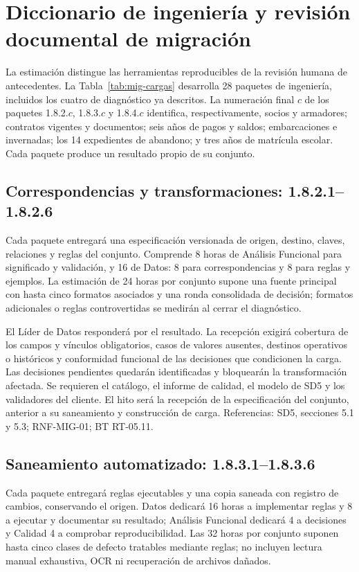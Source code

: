 \section{Diccionario de ingeniería y revisión documental de migración}
La estimación distingue las herramientas reproducibles de la revisión humana de antecedentes. La Tabla~\ref{tab:mig-cargas} desarrolla 28 paquetes de ingeniería, incluidos los cuatro de diagnóstico ya descritos. La numeración final $c$ de los paquetes 1.8.2.$c$, 1.8.3.$c$ y 1.8.4.$c$ identifica, respectivamente, socios y armadores; contratos vigentes y documentos; seis años de pagos y saldos; embarcaciones e invernadas; los 14 expedientes de abandono; y tres años de matrícula escolar. Cada paquete produce un resultado propio de su conjunto.



\subsection{Correspondencias y transformaciones: 1.8.2.1--1.8.2.6}
Cada paquete entregará una especificación versionada de origen, destino, claves, relaciones y reglas del conjunto. Comprende 8 horas de Análisis Funcional para significado y validación, y 16 de Datos: 8 para correspondencias y 8 para reglas y ejemplos. La estimación de 24 horas por conjunto supone una fuente principal con hasta cinco formatos asociados y una ronda consolidada de decisión; formatos adicionales o reglas controvertidas se medirán al cerrar el diagnóstico.

El Líder de Datos responderá por el resultado. La recepción exigirá cobertura de los campos y vínculos obligatorios, casos de valores ausentes, destinos operativos o históricos y conformidad funcional de las decisiones que condicionen la carga. Las decisiones pendientes quedarán identificadas y bloquearán la transformación afectada. Se requieren el catálogo, el informe de calidad, el modelo de SD5 y los validadores del cliente. El hito será la recepción de la especificación del conjunto, anterior a su saneamiento y construcción de carga. Referencias: SD5, secciones 5.1 y 5.3; RNF-MIG-01; BT RT-05.11.

\subsection{Saneamiento automatizado: 1.8.3.1--1.8.3.6}
Cada paquete entregará reglas ejecutables y una copia saneada con registro de cambios, conservando el origen. Datos dedicará 16 horas a implementar reglas y 8 a ejecutar y documentar su resultado; Análisis Funcional dedicará 4 a decisiones y Calidad 4 a comprobar reproducibilidad. Las 32 horas por conjunto suponen hasta cinco clases de defecto tratables mediante reglas; no incluyen lectura manual exhaustiva, OCR ni recuperación de archivos dañados.

